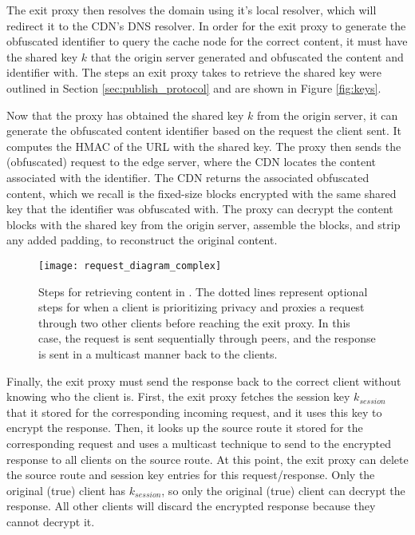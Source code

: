 The exit proxy then resolves the domain using it's local resolver, which will redirect it to the CDN's DNS resolver. In order for the exit proxy to 
generate the obfuscated identifier to query the cache node for the correct content, 
it must have the shared key $k$ that the origin server generated and obfuscated the content and identifier 
with.  The steps an exit proxy takes to retrieve the shared key were outlined in Section \ref{sec:publish_protocol} and are shown in Figure \ref{fig:keys}.

Now that the proxy has obtained the shared key $k$ from the origin server, it can generate the obfuscated content identifier based 
on the request the client sent.  It computes the HMAC of the URL with the shared key.  The proxy then 
sends the (obfuscated) request to the edge server, where the CDN locates the content associated with the identifier.  The CDN returns 
the associated obfuscated content, which we recall is the fixed-size blocks encrypted with the same shared key that the identifier was 
obfuscated with.  The proxy can decrypt the content blocks with the shared key from the origin server, assemble the blocks, and strip any 
added padding, to reconstruct the original content.


\begin{figure}[t!]
\centering
\texttt{[image: request\_diagram\_complex]}
\caption{Steps for retrieving content in \system{}.  The dotted lines represent 
optional steps for when a client is prioritizing 
privacy and proxies a request through two other clients before reaching the 
exit proxy.  In this case, the request is sent sequentially through peers, 
and the response is sent in a multicast manner back to the clients.}
\label{fig:retrieving2}
\end{figure}

Finally, the exit proxy must send the response back to the correct client without
knowing who the client is.  First, the exit proxy fetches the session key $k_{session}$
that it stored for the corresponding incoming request, and it uses this key to encrypt the response.  Then, it looks up the source route it stored for the corresponding request 
and uses a multicast technique to send to the encrypted response to all clients on the source route.  At this point, the exit proxy can delete the source route and session key entries 
for this request/response.  Only the original (true) client has $k_{session}$, so only the original (true) client can decrypt the response.  All other clients will discard 
the encrypted response because they cannot decrypt it.  

